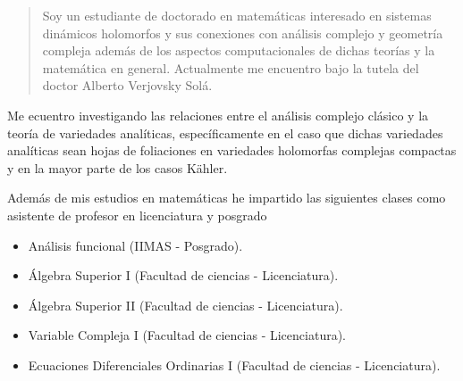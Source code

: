 \documentclass[10pt,a4paper,ragged2e,withhyper]{altacv}
\author{Carlos Eduardo Martínez Aguilar}
\date{\today}
\title{}
\begin{document}
\label{sec:org4cd40ff}

\makecvheader


\label{sec:org2638204}
\begin{paracol}{2}
\begin{quote}
Soy un estudiante de doctorado en matemáticas interesado en sistemas dinámicos holomorfos y sus conexiones con análisis complejo y geometría compleja además de los aspectos computacionales de dichas teorías y la matemática en general. Actualmente me encuentro bajo la tutela del doctor Alberto Verjovsky Solá.
\end{quote}


Me ecuentro investigando las relaciones entre el análisis complejo clásico y la teoría de variedades analíticas, específicamente en el caso que dichas variedades analíticas sean hojas de foliaciones en variedades holomorfas complejas compactas y en la mayor parte de los casos Kähler.


\par\divider
{}

Además de mis estudios en matemáticas he impartido las siguientes clases como asistente de profesor en licenciatura y posgrado 
\begin{itemize}
\item Análisis funcional (IIMAS - Posgrado).
\item Álgebra Superior I (Facultad de ciencias - Licenciatura).
\item Álgebra Superior II (Facultad de ciencias - Licenciatura).
\item Variable Compleja I (Facultad de ciencias - Licenciatura).
\item Ecuaciones Diferenciales Ordinarias I (Facultad de ciencias - Licenciatura).
\end{itemize}


\end{paracol}
\end{document}

